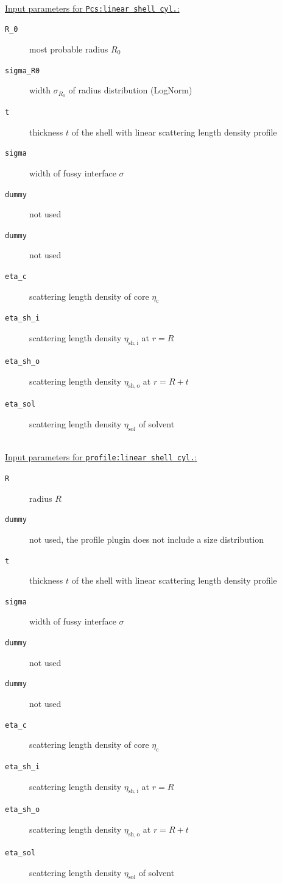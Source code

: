 \vspace{1mm}

\hspace{1pt}\\
\uline{Input parameters for \texttt{Pcs:linear shell cyl.}:}
\begin{description}
    \item[\texttt{R\_0}] most probable radius $R_0$
    \item[\texttt{sigma\_R0}] width $\sigma_{R_0}$ of radius distribution (LogNorm)
    \item[\texttt{t}] thickness $t$ of the shell with linear scattering length density profile
    \item[\texttt{sigma}] width of fussy interface $\sigma$
    \item[\texttt{dummy}] not used
    \item[\texttt{dummy}] not used
    \item[\texttt{eta\_c}] scattering length density of core $\eta_\mathrm{c}$
    \item[\texttt{eta\_sh\_i}] scattering length density $\eta_\mathrm{sh,i}$ at $r=R$
    \item[\texttt{eta\_sh\_o}] scattering length density $\eta_\mathrm{sh,o}$ at $r=R+t$
    \item[\texttt{eta\_sol}] scattering length density $\eta_\mathrm{sol}$ of solvent
\end{description}

\hspace{1pt}\\
\uline{Input parameters for \texttt{profile:linear shell cyl.}:}
\begin{description}
    \item[\texttt{R}] radius $R$
    \item[\texttt{dummy}] not used, the profile plugin does not include a size distribution
    \item[\texttt{t}] thickness $t$ of the shell with linear scattering length density profile
    \item[\texttt{sigma}] width of fussy interface $\sigma$
    \item[\texttt{dummy}] not used
    \item[\texttt{dummy}] not used
    \item[\texttt{eta\_c}] scattering length density of core $\eta_\mathrm{c}$
    \item[\texttt{eta\_sh\_i}] scattering length density $\eta_\mathrm{sh,i}$ at $r=R$
    \item[\texttt{eta\_sh\_o}] scattering length density $\eta_\mathrm{sh,o}$ at $r=R+t$
    \item[\texttt{eta\_sol}] scattering length density $\eta_\mathrm{sol}$ of solvent
\end{description}

